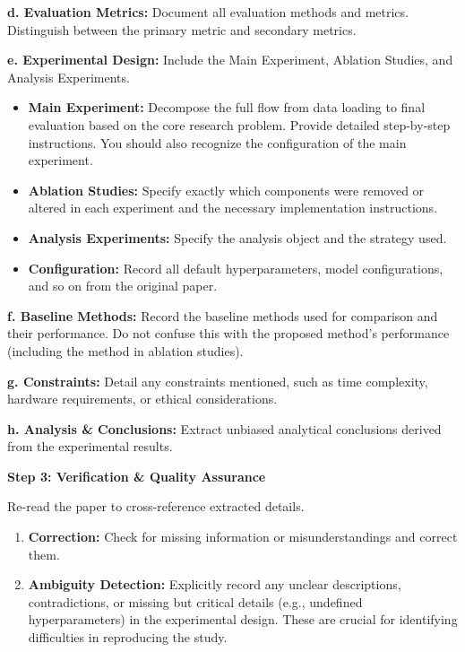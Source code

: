 \begin{tcolorbox}
\smallskip
\textbf{d. Evaluation Metrics:} Document all evaluation methods and metrics. Distinguish between the primary metric and secondary metrics.

\smallskip
\textbf{e. Experimental Design:} Include the Main Experiment, Ablation Studies, and Analysis Experiments.
\begin{itemize}[nosep,leftmargin=12pt]
	\item \textbf{Main Experiment:} Decompose the full flow from data loading to final evaluation based on the core research problem. Provide detailed step-by-step instructions. You should also recognize the configuration of the main experiment.
	\item \textbf{Ablation Studies:} Specify exactly which components were removed or altered in each experiment and the necessary implementation instructions.
	\item \textbf{Analysis Experiments:} Specify the analysis object and the strategy used.
	\item \textbf{Configuration:} Record all default hyperparameters, model configurations, and so on from the original paper.
\end{itemize}

\smallskip
\textbf{f. Baseline Methods:} Record the baseline methods used for comparison and their performance. Do not confuse this with the proposed method's performance (including the method in ablation studies).

\smallskip
\textbf{g. Constraints:} Detail any constraints mentioned, such as time complexity, hardware requirements, or ethical considerations.

\smallskip
\textbf{h. Analysis \& Conclusions:} Extract unbiased analytical conclusions derived from the experimental results.

\medskip
\textbf{Step 3: Verification \& Quality Assurance}

Re-read the paper to cross-reference extracted details.
\begin{enumerate}[nosep,leftmargin=12pt]
	\item \textbf{Correction:} Check for missing information or misunderstandings and correct them.
	\item \textbf{Ambiguity Detection:} Explicitly record any unclear descriptions, contradictions, or missing but critical details (e.g., undefined hyperparameters) in the experimental design. These are crucial for identifying difficulties in reproducing the study.
\end{enumerate}


\end{tcolorbox}
